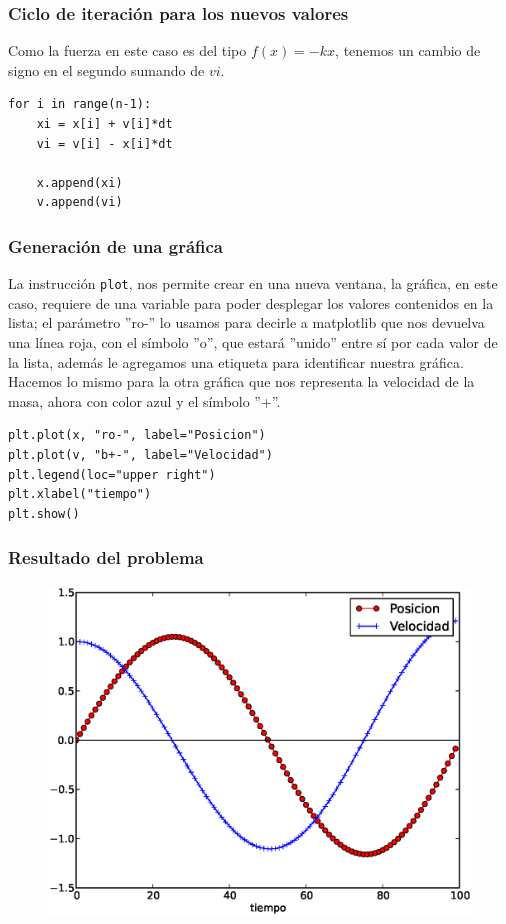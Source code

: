 \begin{frame}[fragile]
\frametitle{Ciclo de iteración para los nuevos valores}
Como la fuerza en este caso es del tipo $f(x) = -kx$, tenemos un cambio de signo en el segundo sumando de $vi$.
\begin{lstlisting}
for i in range(n-1):
    xi = x[i] + v[i]*dt
    vi = v[i] - x[i]*dt
    
    x.append(xi)
    v.append(vi)
\end{lstlisting}
\end{frame}
\begin{frame}[fragile]
\frametitle{Generación de una gráfica}
La instrucción \texttt{plot}, nos permite crear en una nueva ventana, la gráfica, en este caso, requiere de una variable para poder desplegar los valores contenidos en la lista; el parámetro ''ro-'' lo usamos para decirle a matplotlib que nos devuelva una línea roja, con el símbolo ''o'', que estará ''unido'' entre sí por cada valor de la lista, además le agregamos una etiqueta para identificar nuestra gráfica. Hacemos lo mismo para la otra gráfica que nos representa la velocidad de la masa, ahora con color azul y el símbolo ''+''.
\begin{lstlisting}
plt.plot(x, "ro-", label="Posicion")
plt.plot(v, "b+-", label="Velocidad")
plt.legend(loc="upper right")
plt.xlabel("tiempo")
plt.show()
\end{lstlisting}
\end{frame}
\begin{frame}
\frametitle{Resultado del problema}
\begin{figure}
	\centering
	\includegraphics[scale=0.5]{Imagenes/EjerMecanica01.eps} 
\end{figure}
\end{frame}
